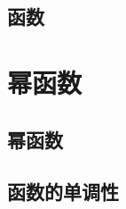 \subsection{函数}
\begin{Practice}
  \begin{question}
    \item 
    \item 
    \item 
    \item 
  \end{question}
\end{Practice}

\begin{Exercise}
  \begin{question}
    \item 
    \item 
    \item 
    \item 
    \item 
    \item 
    \item 
    \item 
    \item 
    \item 
    \item 
    \item 
    \item 
  \end{question}
\end{Exercise}

\section{幂函数}
\subsection{幂函数}
\begin{Practice}
  \begin{question}
    \item 
    \item 
    \item 
    \item 
    \item 
  \end{question}
\end{Practice}
\subsection{函数的单调性}
\begin{Practice}
  \begin{question}
    \item 
    \item 
    \item 
    \item 
  \end{question}
\end{Practice}
